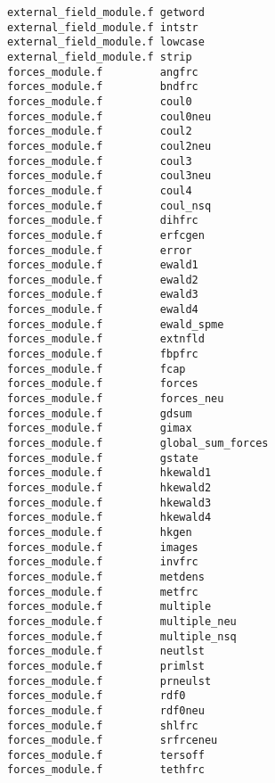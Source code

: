 \begin{verbatim}
external_field_module.f getword                   
external_field_module.f intstr                    
external_field_module.f lowcase                   
external_field_module.f strip                     
forces_module.f         angfrc                    
forces_module.f         bndfrc                    
forces_module.f         coul0                     
forces_module.f         coul0neu                  
forces_module.f         coul2                     
forces_module.f         coul2neu                  
forces_module.f         coul3                     
forces_module.f         coul3neu                  
forces_module.f         coul4                     
forces_module.f         coul_nsq                  
forces_module.f         dihfrc                    
forces_module.f         erfcgen                   
forces_module.f         error                     
forces_module.f         ewald1                    
forces_module.f         ewald2                    
forces_module.f         ewald3                    
forces_module.f         ewald4                    
forces_module.f         ewald_spme                
forces_module.f         extnfld                   
forces_module.f         fbpfrc                
forces_module.f         fcap
forces_module.f         forces                
forces_module.f         forces_neu            
forces_module.f         gdsum                     
forces_module.f         gimax                     
forces_module.f         global_sum_forces         
forces_module.f         gstate                    
forces_module.f         hkewald1                  
forces_module.f         hkewald2                  
forces_module.f         hkewald3                  
forces_module.f         hkewald4                  
forces_module.f         hkgen                     
forces_module.f         images                    
forces_module.f         invfrc                    
forces_module.f         metdens                   
forces_module.f         metfrc                    
forces_module.f         multiple                  
forces_module.f         multiple_neu              
forces_module.f         multiple_nsq              
forces_module.f         neutlst                   
forces_module.f         primlst                   
forces_module.f         prneulst                  
forces_module.f         rdf0                      
forces_module.f         rdf0neu                   
forces_module.f         shlfrc                    
forces_module.f         srfrceneu                 
forces_module.f         tersoff                   
forces_module.f         tethfrc                   

\end{verbatim}
